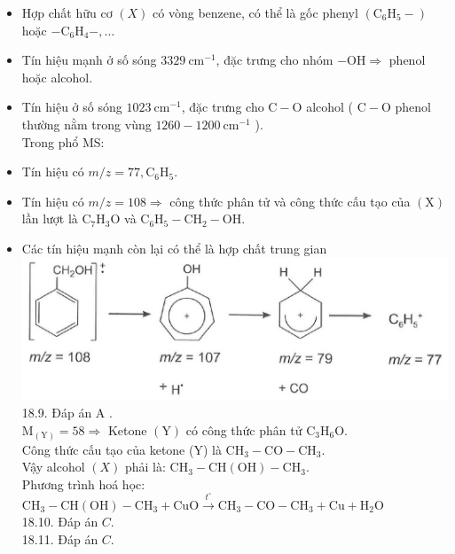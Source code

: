 \documentclass[10pt]{article}
\begin{document}
\begin{itemize}
  \item Hợp chất hữu cơ $(X)$ có vòng benzene, có thể là gốc phenyl $\left(\mathrm{C}_{6} \mathrm{H}_{5}-\right)$ hoặc $-\mathrm{C}_{6} \mathrm{H}_{4}-, \ldots$
  \item Tín hiệu mạnh ở số sóng $3329 \mathrm{~cm}^{-1}$, đặc trưng cho nhóm $-\mathrm{OH} \Rightarrow$ phenol hoặc alcohol.
  \item Tín hiệu ở số sóng $1023 \mathrm{~cm}^{-1}$, đặc trưng cho $\mathrm{C}-\mathrm{O}$ alcohol ( $\mathrm{C}-\mathrm{O}$ phenol thường nằm trong vùng $1260-1200 \mathrm{~cm}^{-1}$ ).\\
Trong phổ MS:
  \item Tín hiệu có $m / z=77, \mathrm{C}_{6} \mathrm{H}_{5}$.
  \item Tín hiệu có $m / z=108 \Rightarrow$ công thức phân tử và công thức cấu tạo của $(\mathrm{X})$ lần lượt là $\mathrm{C}_{7} \mathrm{H}_{3} \mathrm{O}$ và $\mathrm{C}_{6} \mathrm{H}_{5}-\mathrm{CH}_{2}-\mathrm{OH}$.
  \item Các tín hiệu mạnh còn lại có thể là hợp chất trung gian\\
\includegraphics[max width=\textwidth, center]{2025_10_23_adad5b98d65ac6665838g-36(1)}\\
18.9. Đáp án A .\\
$\mathrm{M}_{(\mathrm{Y})}=58 \Rightarrow$ Ketone $(\mathrm{Y})$ có công thức phân tử $\mathrm{C}_{3} \mathrm{H}_{6} \mathrm{O}$.\\
Công thức cấu tạo của ketone (Y) là $\mathrm{CH}_{3}-\mathrm{CO}-\mathrm{CH}_{3}$.\\
Vậy alcohol $(X)$ phải là: $\mathrm{CH}_{3}-\mathrm{CH}(\mathrm{OH})-\mathrm{CH}_{3}$.\\
Phương trình hoá học:\\
$\mathrm{CH}_{3}-\mathrm{CH}(\mathrm{OH})-\mathrm{CH}_{3}+\mathrm{CuO} \xrightarrow{t^{\circ}} \mathrm{CH}_{3}-\mathrm{CO}-\mathrm{CH}_{3}+\mathrm{Cu}+\mathrm{H}_{2} \mathrm{O}$\\
18.10. Đáp án $C$.\\
18.11. Đáp án $C$.
\end{itemize}
\end{document}
